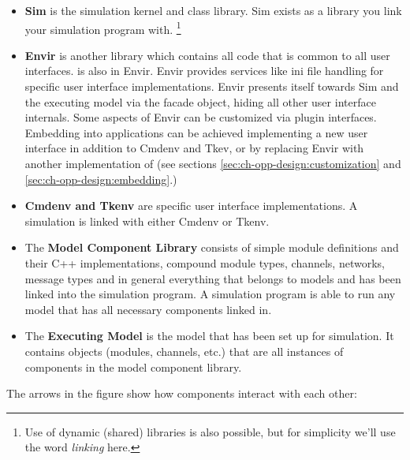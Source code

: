 \begin{itemize}
  \item{\textbf{Sim} is the simulation kernel and class
    library. Sim exists as a library you link
    your simulation program with.
       \footnote{Use of dynamic (shared) libraries is also possible, but
       for simplicity we'll use the word \textit{linking} here.}
    }
  \item{\textbf{Envir} is another library which contains all code
    that is common to all user interfaces.  is also in Envir.
    Envir provides services like ini file handling for specific user interface
    implementations. Envir presents itself towards Sim and the executing model
    via the  facade object, hiding all other user interface internals.
    Some aspects of Envir can be customized via plugin
    interfaces. Embedding {\opp} into applications can
    be achieved implementing a new user interface in addition to Cmdenv and Tkev,
    or by replacing Envir with another implementation of 
    (see sections \ref{sec:ch-opp-design:customization} and
    \ref{sec:ch-opp-design:embedding}.)}
  \item{\textbf{Cmdenv and Tkenv} are specific user interface
    implementations. A simulation is linked with
    either Cmdenv or Tkenv.}
  \item{The \textbf{Model Component Library} consists of simple module definitions and
    their C++ implementations, compound module types, channels, networks,
    message types and in general everything that belongs to models and
    has been linked into the simulation program. A simulation program is
    able to run any model that has all necessary components linked in.}
  \item{The \textbf{Executing Model} is the model that has been set up
    for simulation. It contains objects (modules, channels, etc.) that
    are all instances of components in the model component library.}
\end{itemize}

The arrows in the figure show how components interact with
each other:

